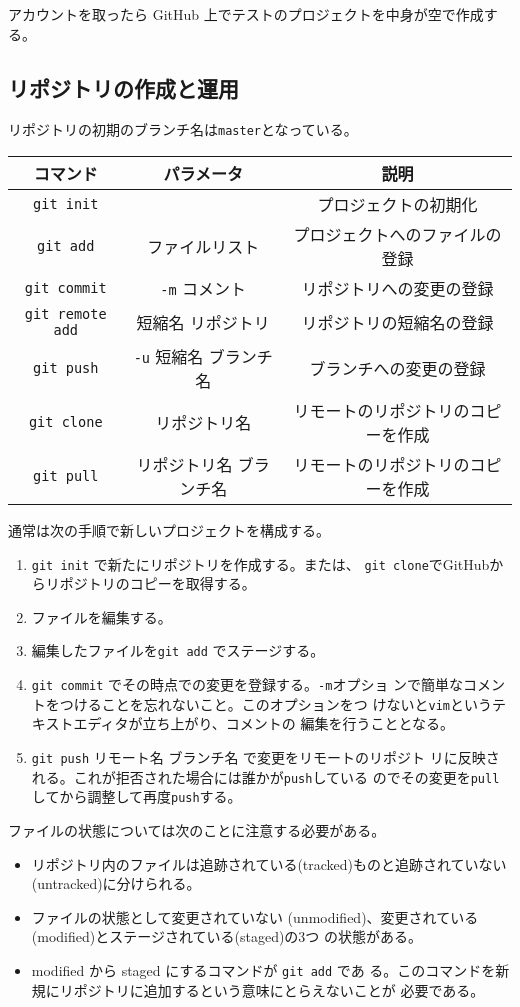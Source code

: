 アカウントを取ったら GitHub 上でテストのプロジェクトを中身が空で作成する。


\subsection{リポジトリの作成と運用}
リポジトリの初期のブランチ名は\Verb+master+となっている。

\begin{tabular}{|c|c|c|}\hline
コマンド&パラメータ&説明\\\hline
\Verb+git init+ & &プロジェクトの初期化\\\hline
\Verb+git add+ & ファイルリスト&プロジェクトへのファイルの登録 \\\hline
\Verb+git commit+& \Verb+-m+ コメント& リポジトリへの変更の登録\\ \hline
\Verb+git remote add+ &短縮名 リポジトリ & リポジトリの短縮名の登録\\
 \hline
\Verb+git push+ &\Verb+-u+ 短縮名 ブランチ名 &ブランチへの変更の登録 \\ \hline
\Verb+git clone+ &リポジトリ名 &リモートのリポジトリのコピーを作成\\ \hline
\Verb+git pull+ &リポジトリ名 ブランチ名 &リモートのリポジトリのコピーを作成\\ \hline
\end{tabular}

通常は次の手順で新しいプロジェクトを構成する。
\begin{enumerate}
 \item \Verb+git init+ で新たにリポジトリを作成する。または、
			 \Verb+git clone+でGitHubからリポジトリのコピーを取得する。
 \item ファイルを編集する。
 \item 編集したファイルを\Verb+git add+ でステージする。
 \item \Verb+git commit+ でその時点での変更を登録する。\Verb+-m+オプショ
			 ンで簡単なコメントをつけることを忘れないこと。このオプションをつ
			 けないと\Verb+vim+というテキストエディタが立ち上がり、コメントの
			 編集を行うこととなる。
 \item \Verb+git push+ リモート名 ブランチ名 で変更をリモートのリポジト
			 リに反映される。これが拒否された場合には誰かが\Verb+push+している
			 のでその変更を\Verb+pull+してから調整して再度\Verb+push+する。
\end{enumerate}
ファイルの状態については次のことに注意する必要がある。
\begin{itemize}
 \item リポジトリ内のファイルは追跡されている(tracked)ものと追跡されていない
(untracked)に分けられる。
 \item ファイルの状態として変更されていない
(unmodified)、変更されている(modified)とステージされている(staged)の3つ
の状態がある。
 \item modified から staged にするコマンドが \Verb+git add+ であ
る。このコマンドを新規にリポジトリに追加するという意味にとらえないことが
必要である。
\end{itemize}
